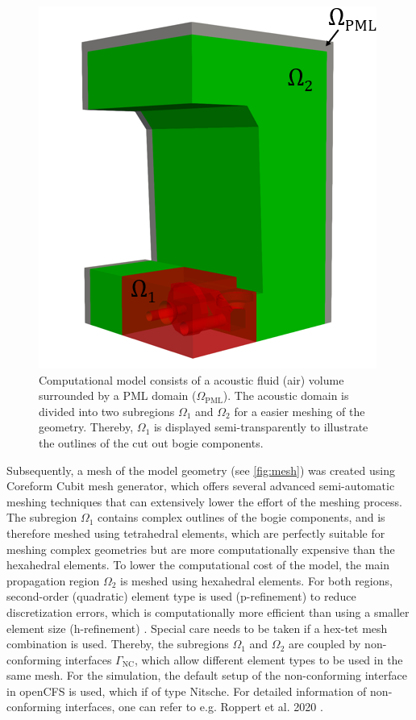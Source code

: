 \begin{figure}
	\centering
	\includegraphics{fig/chap4/mesh/region_small.png}
	\caption{Computational model consists of a acoustic fluid (air) volume surrounded by a PML domain ($\Omega_{\text{PML}}$). The acoustic domain is divided into two subregions $\Omega_1$ and $\Omega_2$ for a easier meshing of the geometry. Thereby, $\Omega_1$ is displayed semi-transparently to illustrate the outlines of the cut out bogie components.}
	\label{fig:regions}
\end{figure}
Subsequently, a mesh of the model geometry (see \cref{fig:mesh}) was created using Coreform Cubit \cite{cubit} mesh generator, which offers several advanced semi-automatic meshing techniques that can extensively lower the effort of the meshing process. The subregion $\Omega_1$ contains complex outlines of the bogie components, and is therefore meshed using tetrahedral elements, which are perfectly suitable for meshing complex geometries but are more computationally expensive than the hexahedral elements. To lower the computational cost of the model, the main propagation region $\Omega_2$ is meshed using hexahedral elements. For both regions, second-order (quadratic) element type is used (p-refinement) to reduce discretization errors, which is computationally more efficient than using a smaller element size (h-refinement) \cite{Kuo_2007_prefinement}.
Special care needs to be taken if a hex-tet mesh combination is used. Thereby, the subregions $\Omega_1$ and $\Omega_2$ are coupled by non-conforming interfaces $\Gamma_\text{NC}$, which allow different element types to be used in the same mesh. For the simulation, the default setup of the non-conforming interface in openCFS is used, which if of type Nitsche. For detailed information of non-conforming interfaces, one can refer to e.g. Roppert et al. 2020 \cite{Roppert_2020_nc_interface}.
